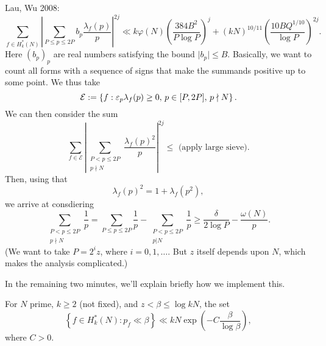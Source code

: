 \documentclass[reqno]{amsart} 
\begin{document}
Lau, Wu 2008:
\begin{equation*}
  \sum_{f \in H_k^\ast (N) } \left\lvert \sum_{P \leq p \leq 2 P}
    b_p \frac{\lambda_f (p)}{ p }
  \right\rvert^{2 j } \ll k \varphi (N) \left( \frac{3 8 4 B^2 }{ P \log P } \right)^j
  + (k N )^{10 /11}
  \left( \frac{10 B Q^{1/10}}{ \log P}  \right)^{2 j}.
\end{equation*}
Here $(b_p)_p$ are real numbers satisfying the bound $\lvert b_p \rvert \leq B$.  Basically, we want to count all forms with a sequence of signs that make the summands positive up to some point.  We thus take
\begin{equation*}
  \mathcal{E} := \left\{ f  : \varepsilon_p \lambda_f (p) \geq 0, \, p \in [P, 2 P], \, p \nmid N \right\}.
\end{equation*}
We can then consider the sum
\begin{equation*}
  \sum_{f \in \mathcal{E} }
  \left\lvert \sum_{
      \substack{
        P < p \leq 2 P  \\
        p \nmid N
      }
    }
    \frac{\lambda_f (p)^2 }{ p}\right\rvert^{2 j}
  \leq \text{ (apply large sieve).}  
\end{equation*}
Then, using that
\begin{equation*}
  \lambda_f (p)^2 = 1 + \lambda_f (p^2 ),
\end{equation*}
we arrive at consdiering
\begin{equation*}
  \sum_{
    \substack{
      P < p \leq 2 P  \\
      p \nmid N
    }
  }
  \frac{1}{p}
  = \sum_{P \leq p \leq 2 P} \frac{1}{ p}
  - \sum_{
    \substack{
      P < p \leq 2 P  \\
      p | N
    }
  }
  \frac{1}{p}
  \geq \frac{\delta }{2 \log P} - \frac{\omega (N) }{p}.  
\end{equation*}
(We want to take $P = 2^i z$, where $i = 0,1,\dotsc$.  But $z$ itself depends upon $N$, which makes the analysis complicated.)

In the remaining two minutes, we'll explain briefly how we implement this.

\begin{corollary}
  For $N$ prime, $k \geq 2$ (not fixed), and $z < \beta \leq \log k N$, the set
  \begin{equation*}
    \left\{ f \in H_k^\ast (N) : p_f \ll \beta  \right\}
    \ll k N \exp \left( - C \frac{\beta }{ \log \beta } \right),
  \end{equation*}
  where $C > 0$.
\end{corollary}
\end{document}
